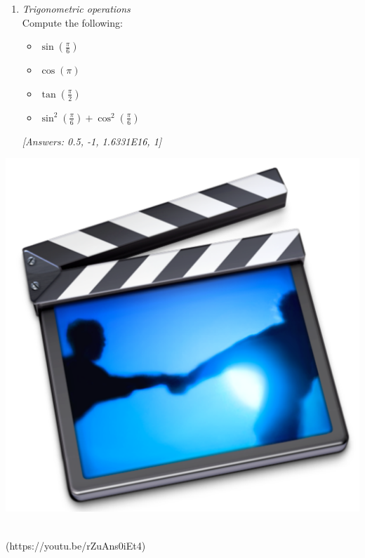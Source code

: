 {\begin{minipage}{\linewidth}
\begin{enumerate}
Compute the following:
	\begin{itemize}
	\item $e^3$
	\item $ln(e^3)$
	\item $log_{10}(e^3)$
	\item $log_{10}(10^5)$
	\end{itemize}
\footnotesize{\textit{[Answers: 20.0855, 3, 1.3029, 5]}}
\normalsize
\item \textit{Trigonometric operations} \\
Compute the following:
	\begin{itemize}
	\item $\sin(\frac{\pi}{6})$
	\item $\cos(\pi)$
	\item $\tan(\frac{\pi}{2})$
	\item $\sin^2(\frac{\pi}{6}) + \cos^2(\frac{\pi}{6})$
	\end{itemize}
\footnotesize{\textit{[Answers: 0.5, -1, 1.6331E16, 1]}}
\normalsize
\end{enumerate}
\begin{minipage}{6mm}
\includegraphics[scale=0.03]{Graphics/General/screencast_icon}
\end{minipage}
\href{https://youtu.be/rZuAns0iEt4}{}\\
(https://youtu.be/rZuAns0iEt4)
\end{minipage}%
}\\
\addtolength{\parindent}{4mm}

